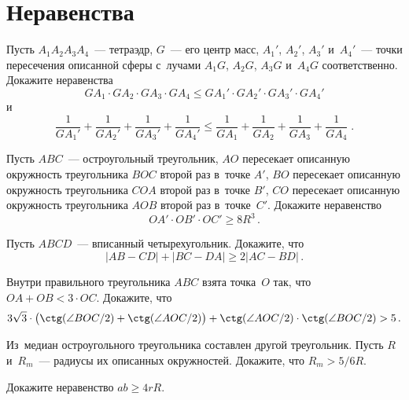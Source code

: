 

\section*{Неравенства}


\begingroup
    \def\abs#1{\lvert #1 \rvert}%

\begin{problems}

\item
Пусть $A_1 A_2 A_3 A_4$~--- тетраэдр, $G$~--- его центр масс,
$A_1'$, $A_2'$, $A_3'$ и~$A_4'$~--- точки пересечения описанной сферы с~лучами
$A_1 G$, $A_2 G$, $A_3 G$ и~$A_4 G$ соответственно.
Докажите неравенства
\[
    G A_1 \cdot G A_2 \cdot G A_3 \cdot G A_4
\leq
    G A_1' \cdot G A_2' \cdot G A_3' \cdot G A_4'
\]
и
\[
    \frac{1}{G A_1'} + \frac{1}{G A_2'} + \frac{1}{G A_3'} + \frac{1}{G A_4'}
\leq
    \frac{1}{G A_1} + \frac{1}{G A_2} + \frac{1}{G A_3} + \frac{1}{G A_4}
\; . \]

\item
Пусть $ABC$~--- остроугольный треугольник, $AO$ пересекает описанную окружность
треугольника $BOC$ второй раз в~точке $A'$, $BO$ пересекает описанную
окружность треугольника $COA$ второй раз в~точке $B'$, $CO$ пересекает
описанную окружность треугольника $AOB$ второй раз в~точке~$C'$.
Докажите неравенство
\[
    OA' \cdot OB' \cdot OC'
\geq
    8 R^3
\, . \]

\item
Пусть $ABCD$~--- вписанный
четырехугольник. Докажите, что
\[
    \abs{AB - CD} + \abs{BC - DA}
\geq
    2 \abs{AC - BD}
\, . \]

\item
Внутри правильного треугольника $ABC$ взята точка~$O$ так, что
$OA + OB < 3 \cdot OC$.
Докажите, что
\[
    3 \sqrt{3} \cdot
    \bigl(
        \ctg(\angle BOC / 2) + \ctg(\angle AOC / 2)
    \bigr)
    +
    \ctg(\angle AOC / 2) \cdot \ctg(\angle BOC / 2)
>
    5
\, . \]

\item
Из~медиан остроугольного треугольника составлен другой треугольник.
Пусть $R$ и~$R_m$~--- радиусы их описанных окружностей.
Докажите, что $R_m > 5 / 6 R$.

\item
Докажите неравенство $a b \geq 4 r R$.


\end{problems}
